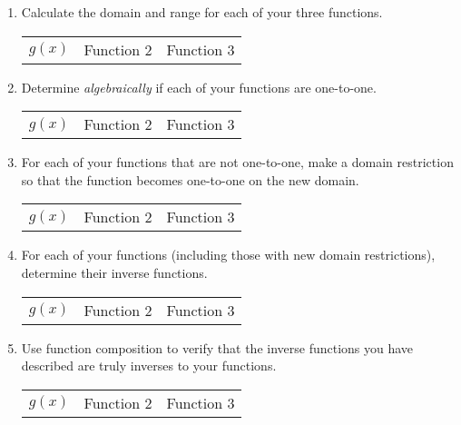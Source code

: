 \begin{enumerate}
\begin{tabular}{p{0.5\linewidth}p{0.5\linewidth}}
\begin{tikzpicture}[y=.6cm, x=.6cm,font=\sffamily,
	mydot/.style={
    circle,
    fill=white,
    draw,
    outer sep=0pt,
    inner sep=1.5pt
  }]
  \end{tikzpicture}
  
  
\end{tabular}


\item Calculate the domain and range for each of your three
  functions. \\
  \begin{tabular}{p{}p{}p{}}
    $g(x)$ & Function 2 & Function 3
  \end{tabular}

  \vfill
  
  \clearpage

\item Determine \emph{algebraically} if each of your functions are one-to-one.  \\
  \begin{tabular}{p{}p{}p{}}
    $g(x)$ & Function 2 & Function 3
  \end{tabular}

  \vfill
  \vfill

\item For each of your functions that are not one-to-one, make a
  domain restriction so that the function becomes one-to-one on the
  new domain.

  \begin{tabular}{p{}p{}p{}}
    $g(x)$ & Function 2 & Function 3 
  \end{tabular}

\vfill

\clearpage

\item For each of your functions (including those with new domain
  restrictions), determine their inverse functions. \\
  \begin{tabular}{p{}p{}p{}}
    $g(x)$ & Function 2 & Function 3
  \end{tabular}


\vfill

\item Use function composition to verify that the inverse functions
  you have described are truly inverses to your functions.

  \begin{tabular}{p{}p{}p{}}
    $g(x)$ & Function 2 & Function 3 
  \end{tabular}


\end{enumerate}
